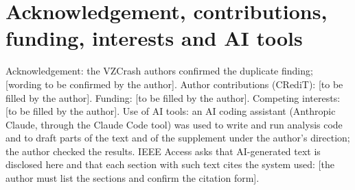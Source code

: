 \documentclass{ieeeaccess}
\begin{document}
\section*{Acknowledgement, contributions, funding, interests and AI tools}
Acknowledgement: the VZCrash authors confirmed the duplicate finding; [wording to be confirmed by the author]. Author contributions (CRediT): [to be filled by the author]. Funding: [to be filled by the author]. Competing interests: [to be filled by the author]. Use of AI tools: an AI coding assistant (Anthropic Claude, through the Claude Code tool) was used to write and run analysis code and to draft parts of the text and of the supplement under the author's direction; the author checked the results. IEEE Access asks that AI-generated text is disclosed here and that each section with such text cites the system used: [the author must list the sections and confirm the citation form].




\EOD
\end{document}
